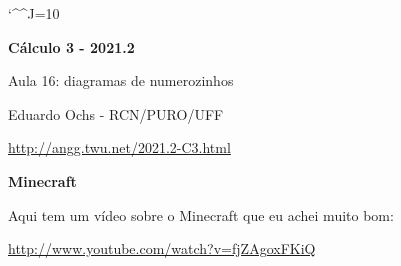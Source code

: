 \documentclass[oneside,12pt]{article}
\begin{document}
\catcode`\^^J=10

\pu


\def\u#1{\par{\footnotesize \url{#1}}}

\def\pictgray#1{{\color{GrayPale}\linethickness{0.3pt}#1}}


\def\drafturl{http://angg.twu.net/LATEX/2021-2-C3.pdf}
\def\drafturl{http://angg.twu.net/2021.2-C3.html}
\def\draftfooter{\tiny \href{\drafturl}{\jobname{}} \ColorBrown{\shorttoday{} \hours}}



%

\thispagestyle{empty}

\begin{center}

\vspace*{1.2cm}

{\bf \Large Cálculo 3 - 2021.2}

\bsk

Aula 16: diagramas de numerozinhos

\bsk

Eduardo Ochs - RCN/PURO/UFF

\url{http://angg.twu.net/2021.2-C3.html}

\end{center}

\newpage


{\bf Minecraft}

Aqui tem um vídeo sobre o Minecraft que eu achei muito bom:

\ssk

{\footnotesize

\url{http://www.youtube.com/watch?v=fjZAgoxFKiQ}

}
\end{document}
